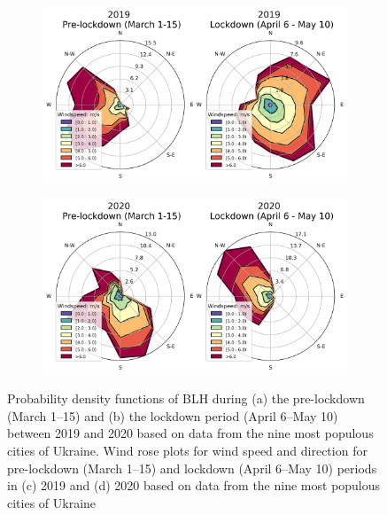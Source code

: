 \begin{figure}[p]
\begin{subfigure}{.5\textwidth}
        \centering
        \includegraphics[width=\textwidth]{figs/chap3/fig4_a_2019.png}
        \caption{}
        \label{fig:fig4a}
    \end{subfigure}%
    \begin{subfigure}{.5\textwidth}
        \centering
        \includegraphics[width=\textwidth]{figs/chap3/fig4_b_2020.png}
        \caption{}
        \label{fig:fig4b}
    \end{subfigure}
    \caption{Probability density functions of BLH during (a) the pre-lockdown (March 1–15) and (b) the lockdown period (April 6–May 10) between 2019 and 2020 based on data from the nine most populous cities of Ukraine. Wind rose plots for wind speed and direction for pre-lockdown (March 1–15) and lockdown (April 6–May 10) periods in (c) 2019 and (d) 2020 based on data from the nine most populous cities of Ukraine}
    \label{fig:fig3_4}
\end{figure}

